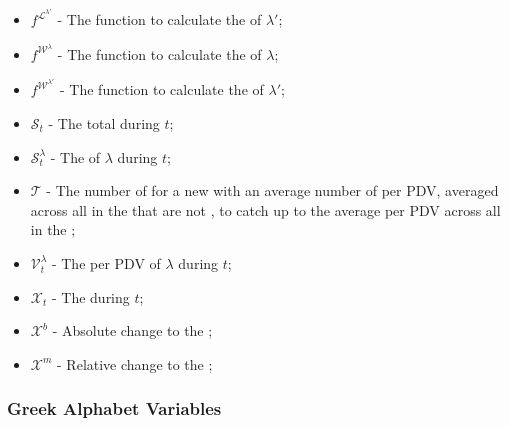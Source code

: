 \documentclass[class=article, crop=false]{standalone}
\begin{document}
\begin{itemize}[topsep=0pt, itemsep=3pt,leftmargin=16pt]
    \item[] $f^{\mathscr{L}^{\lambda'}}$ - The function to calculate the  of $\lambda'$;
    \item[] $f^{\mathscr{W}^{\lambda}}$ - The function to calculate the  of $\lambda$;
    \item[] $f^{\mathscr{W}^{\lambda'}}$ - The function to calculate the  of $\lambda'$;
    \item[] $\mathscr{S}_{t}$ - The total  during $t$;
    \item[] $\mathscr{S}_{t}^{\lambda}$ - The  of $\lambda$ during $t$;
    \item[] $\mathscr{T}$ - The number of  for a new  with an average number of  per PDV, averaged across all  in the  that are not , to catch up to the average  per PDV across all  in the ;
    \item[] $\mathscr{V}_{t}^{\lambda}$ - The  per PDV of $\lambda$ during $t$;
    \item[] $\mathscr{X}_{t}$ - The  during $t$;
    \item[] $\mathscr{X}^{b}$ - Absolute change to the ;
    \item[] $\mathscr{X}^{m}$ - Relative change to the ;
\end{itemize}


\subsubsection{Greek Alphabet Variables}
\end{document}
